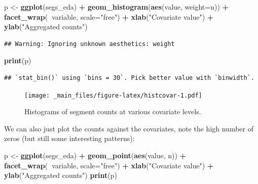 \documentclass[]{book}
\newenvironment{Shaded}{\begin{snugshade}}{\end{snugshade}}
\newcommand{\KeywordTok}[1]{\textcolor[rgb]{0.13,0.29,0.53}{\textbf{#1}}}
\newcommand{\DataTypeTok}[1]{\textcolor[rgb]{0.13,0.29,0.53}{#1}}
\newcommand{\StringTok}[1]{\textcolor[rgb]{0.31,0.60,0.02}{#1}}
\newcommand{\OperatorTok}[1]{\textcolor[rgb]{0.81,0.36,0.00}{\textbf{#1}}}
\newcommand{\NormalTok}[1]{#1}
\theoremstyle{definition}
\theoremstyle{definition}
\theoremstyle{remark}
\begin{document}
\begin{Shaded}
\begin{Highlighting}[]
\NormalTok{p <-}\StringTok{ }\KeywordTok{ggplot}\NormalTok{(segs_eda) }\OperatorTok{+}
\StringTok{       }\KeywordTok{geom_histogram}\NormalTok{(}\KeywordTok{aes}\NormalTok{(value, }\DataTypeTok{weight=}\NormalTok{n)) }\OperatorTok{+}
\StringTok{       }\KeywordTok{facet_wrap}\NormalTok{(}\OperatorTok{~}\NormalTok{variable, }\DataTypeTok{scale=}\StringTok{"free"}\NormalTok{) }\OperatorTok{+}
\StringTok{       }\KeywordTok{xlab}\NormalTok{(}\StringTok{"Covariate value"}\NormalTok{) }\OperatorTok{+}
\StringTok{       }\KeywordTok{ylab}\NormalTok{(}\StringTok{"Aggregated counts"}\NormalTok{)}
\end{Highlighting}
\end{Shaded}

\begin{verbatim}
## Warning: Ignoring unknown aesthetics: weight
\end{verbatim}

\begin{Shaded}
\begin{Highlighting}[]
\KeywordTok{print}\NormalTok{(p)}
\end{Highlighting}
\end{Shaded}

\begin{verbatim}
## `stat_bin()` using `bins = 30`. Pick better value with `binwidth`.
\end{verbatim}

\begin{figure}
\centering
\texttt{[image: \_main\_files/figure-latex/histcovar-1.pdf]}
\caption{\label{fig:histcovar}Histograms of segment counts at various
covariate levels.}
\end{figure}

We can also just plot the counts against the covariates, note the high
number of zeros (but still some interesting patterns):

\begin{Shaded}
\begin{Highlighting}[]
\NormalTok{p <-}\StringTok{ }\KeywordTok{ggplot}\NormalTok{(segs_eda) }\OperatorTok{+}
\StringTok{       }\KeywordTok{geom_point}\NormalTok{(}\KeywordTok{aes}\NormalTok{(value, n)) }\OperatorTok{+}
\StringTok{       }\KeywordTok{facet_wrap}\NormalTok{(}\OperatorTok{~}\NormalTok{variable, }\DataTypeTok{scale=}\StringTok{"free"}\NormalTok{) }\OperatorTok{+}
\StringTok{       }\KeywordTok{xlab}\NormalTok{(}\StringTok{"Covariate value"}\NormalTok{) }\OperatorTok{+}
\StringTok{       }\KeywordTok{ylab}\NormalTok{(}\StringTok{"Aggregated counts"}\NormalTok{)}
\KeywordTok{print}\NormalTok{(p)}
\end{Highlighting}
\end{Shaded}
\end{document}
